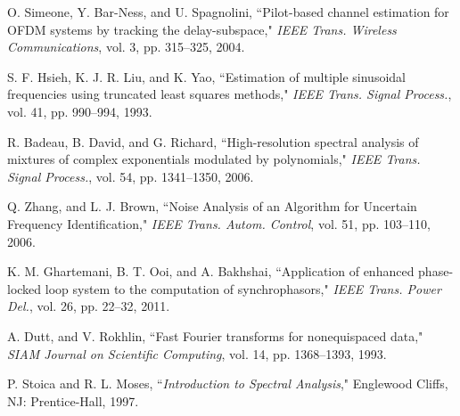 \documentclass{UCF_ETD}
\begin{document}
\begin{thebibliography}{99}
O. Simeone,  Y. Bar-Ness, and U. Spagnolini, ``Pilot-based channel estimation for OFDM systems by tracking the delay-subspace,"  \emph{IEEE Trans. Wireless Communications},  vol. 3, pp. 315--325, 2004.




S. F. Hsieh,  K. J. R. Liu, and K. Yao, ``Estimation of multiple sinusoidal frequencies using truncated least squares methods," \emph{IEEE Trans. Signal Process.}, vol. 41, pp. 990--994, 1993.


R. Badeau, B. David, and G. Richard, ``High-resolution spectral analysis of mixtures of complex exponentials modulated by polynomials,"  \emph{IEEE Trans. Signal Process.},  vol. 54, pp. 1341--1350, 2006.

Q. Zhang, and L. J. Brown, ``Noise Analysis of an Algorithm for Uncertain Frequency Identification," \emph{IEEE Trans. Autom. Control}, vol. 51, pp. 103--110, 2006.


K. M. Ghartemani, B. T. Ooi, and A. Bakhshai, ``Application of enhanced phase-locked loop system to the computation of synchrophasors," \emph{IEEE Trans. Power Del.}, vol. 26, pp. 22--32, 2011.








A. Dutt, and V. Rokhlin, ``Fast Fourier transforms for nonequispaced data," \emph{SIAM Journal on Scientific Computing}, vol. 14, pp. 1368--1393, 1993.

P. Stoica and R. L. Moses, ``\emph{Introduction to Spectral Analysis}," Englewood Cliffs, NJ: Prentice-Hall, 1997.


\end{thebibliography}
\end{document}

